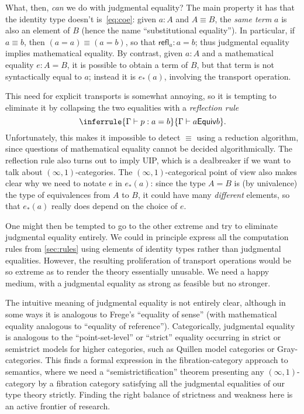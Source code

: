 \documentclass[10pt]{article}
\let\jdeq\equiv
\def\oo{\ensuremath{\infty}}
\def\io{\ensuremath{(\oo,1)}}
\def\refl{\mathsf{refl}}
\def\types{\vdash}
\def\equiv{\mathsf{Equiv}}
\numberwithin{equation}{section}
\begin{document}
\begin{subappendices}
What, then, \emph{can} we do with judgmental equality?
The main property it has that the identity type doesn't is~\eqref{eq:coe}: given $a:A$ and $A\jdeq B$, the \emph{same term} $a$ is also an element of $B$ (hence the name ``substitutional equality'').
In particular, if $a\jdeq b$, then $(a=a)\jdeq (a=b)$, so that $\refl_a : a=b$;
thus judgmental equality implies mathematical equality.
By contrast, given $a:A$ and a mathematical equality $e:A=B$, it is possible to obtain a term of $B$, but that term is not syntactically equal to $a$; instead it is $e_*(a)$, involving the transport operation.

This need for explicit transports is somewhat annoying, so it is tempting to eliminate it by collapsing the two equalities with a \emph{reflection rule}
\[ \inferrule{\Gamma \types p:a=b}{\Gamma\types a\jdeq b}. \]
Unfortunately, this makes it impossible to detect $\jdeq$ using a reduction algorithm, since questions of mathematical equality cannot be decided algorithmically.
The reflection rule also turns out to imply UIP, which is %
a dealbreaker if we want to talk about \io-categories.
The \io-categorical point of view also makes clear why we need to notate $e$ in $e_*(a)$: since the type $A=B$ is (by univalence) the type of equivalences from $A$ to $B$, it could have many \emph{different} elements, so that $e_*(a)$ really does depend on the choice of $e$.

One might then be tempted to go to the other extreme and try to eliminate judgmental equality entirely.
We could in principle express all the computation rules from \cref{sec:rules} using elements of identity types rather than judgmental equalities.
However, the resulting proliferation of transport operations would be so extreme as to render the theory essentially unusable.
We need a happy medium, with a judgmental equality as strong as feasible but no stronger.

The intuitive meaning of judgmental equality is not entirely clear, although in some ways it is analogous to Frege's ``equality of sense'' (with mathematical equality analogous to ``equality of reference'').
Categorically, judgmental equality is analogous to the ``point-set-level'' or ``strict'' equality occurring in strict or semistrict models for higher categories, such as Quillen model categories or Gray-categories.
This finds a formal expression in the fibration-category approach to semantics, where we need a ``semistrictification'' theorem presenting any \io-category by a fibration category satisfying all the judgmental equalities of our type theory strictly.
Finding the right balance of strictness and weakness here is an active frontier of research.


\end{subappendices}
\end{document}
